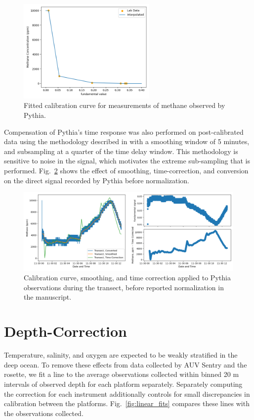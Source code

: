 \begin{figure}[h!]
    \centering
    \includegraphics[width=0.6\textwidth]{figures/nopp_fundamental_calib_inverted.png}
    \caption{Fitted calibration curve for measurements of methane observed by Pythia.}
    \label{fig:nopp_curve}
\end{figure}

Compensation of Pythia's time response was also performed on post-calibrated data using the methodology described in \cite{miloshevich2004development} with a smoothing window of 5 minutes, and subsampling at a quarter of the time delay window. This methodology is sensitive to noise in the signal, which motivates the extreme sub-sampling that is performed. Fig.~\ref{fig:fund_corrected} shows the effect of smoothing, time-correction, and conversion on the direct signal recorded by Pythia before normalization. 

\begin{figure}[h!]
    \centering
    \includegraphics[width=1\textwidth]{figures/pythia_calibration.png}
    \caption[Pythia calibrated field data]{Calibration curve, smoothing, and time correction applied to Pythia observations during the transect, before reported normalization in the manuscript.}
    \label{fig:fund_corrected}
\end{figure}


\section{Depth-Correction}
\label{app:perception:depth}
Temperature, salinity, and oxygen are expected to be weakly stratified in the deep ocean. To remove these effects from data collected by AUV Sentry and the rosette, we fit a line to the average observations collected within binned 20 m intervals of observed depth for each platform separately. Separately computing the correction for each instrument additionally controls for small discrepancies in calibration between the platforms. Fig.~\ref{fig:linear_fits} compares these lines with the observations collected.


